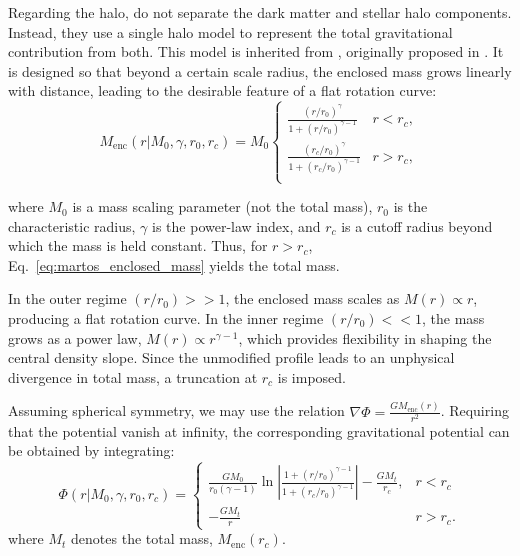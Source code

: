         Regarding the halo, \citet{2017A&A...598A..66P} do not separate the dark matter and stellar halo components. Instead, they use a single halo model to represent the total gravitational contribution from both. This model is inherited from \citet{1991RMxAA..22..255A}, originally proposed in \citet{1986RMxAA..13..137A}. It is designed so that beyond a certain scale radius, the enclosed mass grows linearly with distance, leading to the desirable feature of a flat rotation curve:
        \begin{equation} 
            M_{\mathrm{enc}}(r|M_0,\gamma,r_0,r_c) = M_0
            \begin{cases}
             \frac{\left(r/r_0\right)^\gamma}{1 + \left(r/r_0\right)^{\gamma - 1}} & r<r_c,\\
             \frac{\left(r_c/r_0\right)^\gamma}{1 + \left(r_c/r_0\right)^{\gamma - 1}} & r> r_c,\\
            \end{cases} 
            \label{eq:martos_enclosed_mass}
        \end{equation}

        where $M_0$ is a mass scaling parameter (not the total mass), $r_0$ is the characteristic radius, $\gamma$ is the power-law index, and $r_c$ is a cutoff radius beyond which the mass is held constant. Thus, for $r > r_c$, Eq.~\ref{eq:martos_enclosed_mass} yields the total mass. 

        In the outer regime $(r/r_0) >> 1$, the enclosed mass scales as $M(r) \propto r$, producing a flat rotation curve. In the inner regime $(r/r_0) << 1$, the mass grows as a power law, $M(r) \propto r^{\gamma - 1}$, which provides flexibility in shaping the central density slope. Since the unmodified profile leads to an unphysical divergence in total mass, a truncation at $r_c$ is imposed.

        Assuming spherical symmetry, we may use the relation $\nabla \Phi = \frac{G M_{\mathrm{enc}}(r)}{r^2}$. Requiring that the potential vanish at infinity, the corresponding gravitational potential can be obtained by integrating:
        \begin{equation}
            \Phi(r|M_0,\gamma,r_0,r_c) = 
            \begin{cases}
                \frac{GM_0}{r_0\left(\gamma-1\right)}\ln\left|\frac{1+(r/r_0)^{\gamma-1}}{1+(r_c/r_0)^{\gamma-1}}\right| -\frac{GM_t}{r_c}, & r<r_c\\
                -\frac{GM_t}{r} & r>r_c.
            \end{cases}
        \end{equation}
        where $M_t$ denotes the total mass, $M_{\mathrm{enc}}(r_c)$.

